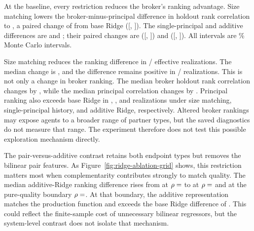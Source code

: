 At the baseline, every restriction reduces the broker's ranking advantage.
Size matching lowers the broker-minus-principal difference in holdout rank
correlation to , a paired change of
 from base Ridge
([,
]). The single-principal and
additive differences are  and
; their paired changes are
([,
]) and
([,
]). All intervals are
\% Monte Carlo intervals.

Size matching reduces the ranking difference in
/ effective realizations. The
median change is , and the difference
remains positive in
/ realizations. This is not
only a change in broker ranking. The median broker holdout rank correlation
changes by , while the median
principal correlation changes by
. Principal ranking also
exceeds base Ridge in ,
, and
 realizations under size matching,
single-principal history, and additive Ridge, respectively. Altered broker
rankings may expose agents to a broader range of partner types, but the saved
diagnostics do not measure that range. The experiment therefore does not test
this possible exploration mechanism directly.

The pair-versus-additive contrast retains both endpoint types but removes the
bilinear pair features. As Figure~\ref{fig:ridge-ablation-grid} shows, this
restriction matters most when complementarity contributes strongly to match
quality. The median additive-Ridge ranking difference rises from
 at $\rho=\rav{rhoInteriorMin}$ to
 at $\rho=\rav{rhoInteriorMax}$ and
 at the pure-quality boundary
$\rho=\rav{rhoBoundary}$. At that boundary, the additive representation matches
the production function and exceeds the base Ridge difference of
. This could reflect the finite-sample cost of unnecessary
bilinear regressors, but the system-level contrast does not isolate that
mechanism.

